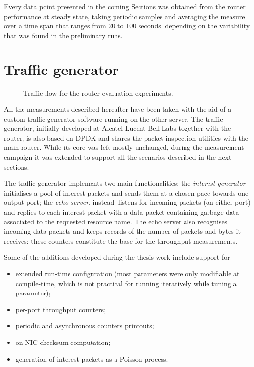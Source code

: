 \documentclass[11pt,a4paper,twoside,titlepage,openany]{book}
\begin{document}
Every data point presented in the coming Sections was obtained from the router performance at steady state, taking periodic samples and averaging the measure over a time span that ranges from $20$ to $100$ seconds, depending on the variability that was found in the preliminary runs.

\section{Traffic generator}\label{sec:test.traffgen}
\begin{figure}[tb]
  \begin{center}
    
    \caption{Traffic flow for the router evaluation experiments.}
    \label{fig:test.flow}
  \end{center}
\end{figure}
All the measurements described hereafter have been taken with the aid of a custom traffic generator software running on the other server. The traffic generator, initially developed at Alcatel-Lucent Bell Labs together with the router, is also based on DPDK and shares the packet inspection utilities with the main router. While its core was left mostly unchanged, during the measurement campaign it was extended to support all the scenarios described in the next sections.

The traffic generator implements two main functionalities: the \emph{interest generator} initialises a pool of interest packets and sends them at a chosen pace towards one output port; the \emph{echo server}, instead, listens for incoming packets (on either port) and replies to each interest packet with a data packet containing garbage data associated to the requested resource name. The echo server also recognises incoming data packets and keeps records of the number of packets and bytes it receives: these counters constitute the base for the throughput measurements.

Some of the additions developed during the thesis work include support for:
\begin{itemize}[noitemsep,nolistsep]
  \item extended run-time configuration (most parameters were only modifiable at compile-time, which is not practical for running iteratively while tuning a parameter);
  \item per-port throughput counters;
  \item periodic and asynchronous counters printouts;
  \item on-NIC checksum computation;
  \item generation of interest packets as a Poisson process.
\end{itemize}
\end{document}
